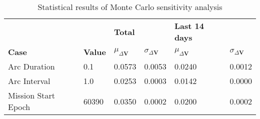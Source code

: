 \begin{table}[h!]
\centering
\begin{tabular}{llllll}
 &  & \cellcolor[HTML]{EFEFEF}\textbf{Total} &  & \cellcolor[HTML]{EFEFEF}\textbf{Last 14 days} &  \\
\rowcolor[HTML]{EFEFEF} 
\textbf{Case} & \textbf{Value} & \textbf{$\mu_{\Delta \boldsymbol{V}}$} & \textbf{$\sigma_{\Delta \boldsymbol{V}}$} & \textbf{$\mu_{\Delta \boldsymbol{V}}$} & \textbf{$\sigma_{\Delta \boldsymbol{V}}$} \\ 
Arc Duration & 0.1 & 0.0573 & 0.0053 & 0.0240 & 0.0012 \\ 
Arc Interval & 1.0 & 0.0253 & 0.0003 & 0.0142 & 0.0000 \\ 
Mission Start Epoch & 60390 & 0.0350 & 0.0002 & 0.0200 & 0.0002 \\ 
\end{tabular}
\caption{Statistical results of Monte Carlo sensitivity analysis}
\label{tab:SensitivityAnalysis}
\end{table}